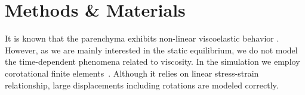 \section{Methods \& Materials}
\label{sec:methodology}
\vspace{-6pt}


It is known that the parenchyma exhibits non-linear viscoelastic behavior \cite{Marchesseau2010}.
However, as we are mainly interested in the static equilibrium, we do not model the time-dependent
phenomena related to viscosity. In the simulation we employ corotational finite elements~\cite{Felippa2005}.
Although it relies on linear stress-strain relationship, large displacements including rotations are modeled correctly.


